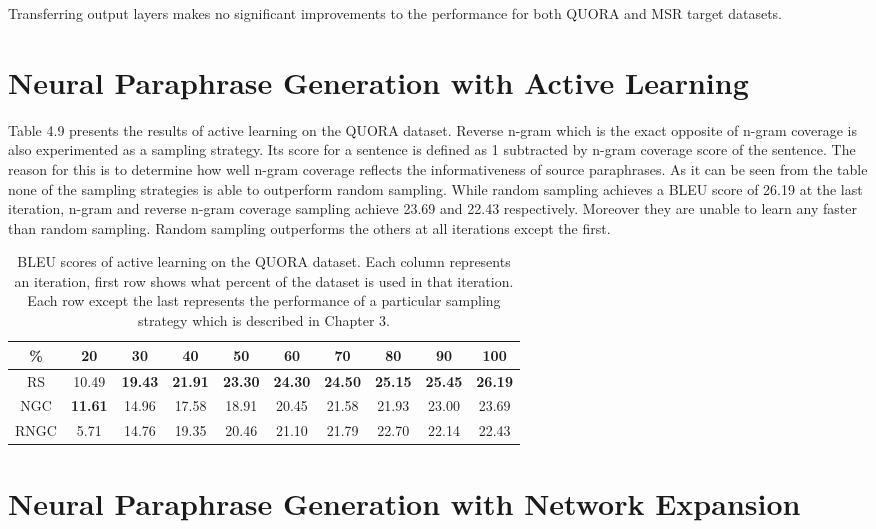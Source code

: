 Transferring output layers makes no significant improvements to the performance for both QUORA and MSR target datasets.


\section{Neural Paraphrase Generation with Active Learning}

Table 4.9 presents the results of active learning on the QUORA dataset. Reverse n-gram which is the exact opposite of n-gram coverage is also experimented as a sampling strategy. Its score for a sentence is defined as 1 subtracted by n-gram coverage score of the sentence. The reason for this is to determine how well n-gram coverage reflects the informativeness of source paraphrases. As it can be seen from the table none of the sampling strategies is able to outperform random sampling. While random sampling achieves a BLEU score of 26.19 at the last iteration, n-gram and reverse n-gram coverage sampling achieve 23.69 and 22.43 respectively. Moreover they are unable to learn any faster than random sampling. Random sampling outperforms the others at all iterations except the first.

\begin{table}[t]
\centering
\small
 \begin{tabular}{|c | c | c | c | c | c | c | c | c | c |} 
 \hline
 \% & 20 & 30 & 40 & 50 & 60 & 70 & 80 & 90 & 100 \\ [0.5ex] 
 \hline
  RS & 10.49 &  \textbf{19.43} & \textbf{21.91} &  \textbf{23.30} &  \textbf{24.30} &  \textbf{24.50} &  \textbf{25.15} &  \textbf{25.45} &  \textbf{26.19}  \\ 
 \hline
  NGC &  \textbf{11.61} & 14.96 & 17.58 & 18.91 & 20.45 & 21.58 & 21.93 & 23.00 & 23.69 \\ 
 \hline
 RNGC & 5.71 & 14.76 & 19.35 & 20.46 & 21.10 & 21.79 & 22.70 & 22.14 & 22.43 \\ 
 \hline
\end{tabular}
\caption{BLEU scores of active learning on the QUORA dataset. Each column represents an iteration, first row shows what percent of the dataset is used in that iteration. Each row except the last represents the performance of a particular sampling strategy which is described in Chapter 3.}
\end{table}

\section{Neural Paraphrase Generation with Network Expansion}

